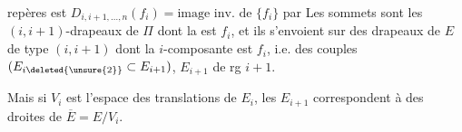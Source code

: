 repères est $D_{i,i+1,\ldots,n}(f_i)=\text{image inv. de }\{f_i\}$ par
 Les sommets sont les  $(i,i+1)$-drapeaux de $\Pi$ dont la  est $f_i$, et ils s'envoient sur des drapeaux de $E$ de type $(i,i+1)$ dont la $i$-composante est $f_i$,  i.e. des couples $(E_{i\deleted{\unsure{2}}}\subset E_{i+1})$, $E_{i+1}$ de rg $i+1$.

Mais si $V_i$ est l'espace des translations de $E_i$, les $E_{i+1}$ correspondent à des droites de $\overline{E}=E/V_i$.
